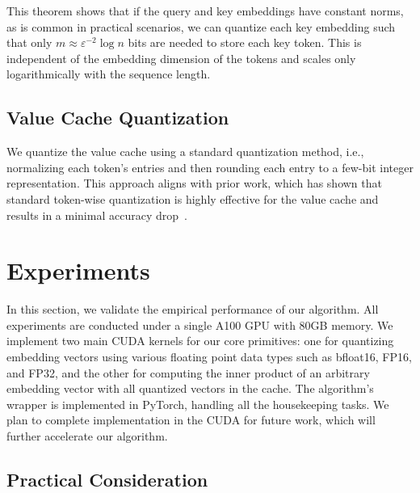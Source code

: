 \documentclass[11pt]{article}
\theoremstyle{plain}
\theoremstyle{definition}
\theoremstyle{remark}
\begin{document}
This theorem shows that if the query and key embeddings have constant norms, as is common in practical scenarios, we can quantize each key embedding such that only $m \approx \varepsilon^{-2} \log n$ bits are needed to store each key token.
This is independent of the embedding dimension of the tokens and scales only logarithmically with the sequence length.

\subsection{Value Cache Quantization}
We quantize the value cache using a standard quantization method, i.e., normalizing each token's entries and then rounding each entry to a few-bit integer representation. 
This approach aligns with prior work, which has shown that standard token-wise quantization is highly effective for the value cache and results in a minimal accuracy drop~\cite{liu2024kivi, hooper2024kvquant}.


\section{Experiments}

In this section, we validate the empirical performance of our algorithm. All experiments are conducted under a single A100 GPU with 80GB memory. 
We implement two main CUDA kernels for our core primitives: one for quantizing embedding vectors using various floating point data types such as bfloat16, FP16, and FP32, and the other for computing the inner product of an arbitrary embedding vector with all quantized vectors in the cache.
The algorithm's wrapper is implemented in PyTorch, handling all the housekeeping tasks.
We plan to complete implementation in the CUDA for future work, which will further accelerate our algorithm.


\subsection{Practical Consideration}
\end{document}
